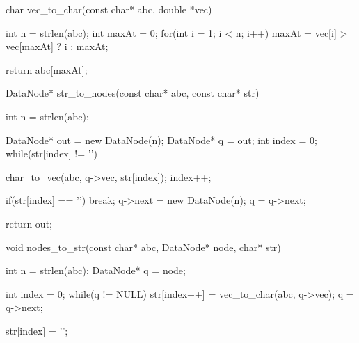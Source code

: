 char vec_to_char(const char* abc, double *vec){
  int n = strlen(abc);
  int maxAt = 0;
  for(int i = 1; i < n; i++)
    maxAt = vec[i] > vec[maxAt] ? i : maxAt;

  return abc[maxAt];
}

DataNode* str_to_nodes(const char* abc, const char* str){
  int n = strlen(abc);

  DataNode* out = new DataNode(n);
  DataNode* q = out;
  int index = 0;
  while(str[index] != '\0'){
    char_to_vec(abc, q->vec, str[index]);
    index++;

    if(str[index] == '\0') break;
    q->next = new DataNode(n);
    q = q->next;
  }

  return out;

}

void nodes_to_str(const char* abc, DataNode* node, char* str){
  int n = strlen(abc);
  DataNode* q = node;

  int index = 0;
  while(q != NULL){
    str[index++] = vec_to_char(abc, q->vec);
    q = q->next;
  }

  str[index] = '\0';

}
